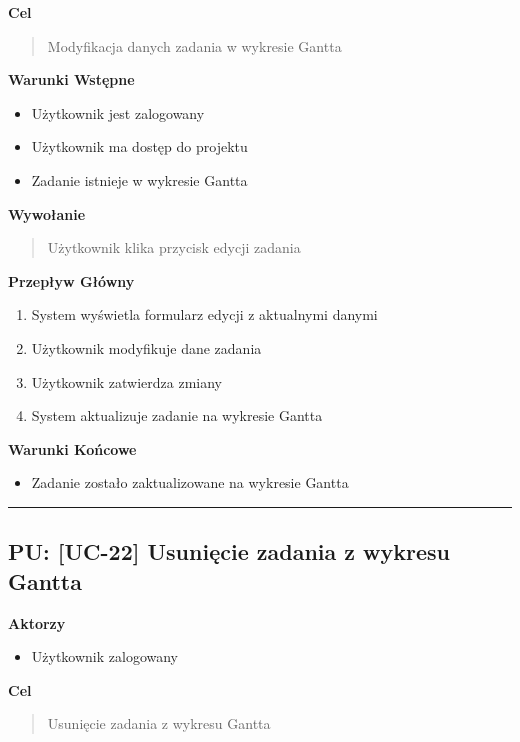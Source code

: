 \vspace{0.2cm}
\noindent\textbf{Cel}
\begin{quote}
    Modyfikacja danych zadania w wykresie Gantta
\end{quote}

\vspace{0.2cm}
\noindent\textbf{Warunki Wstępne}
\begin{itemize}
    \item Użytkownik jest zalogowany
    \item Użytkownik ma dostęp do projektu
    \item Zadanie istnieje w wykresie Gantta
\end{itemize}

\vspace{0.2cm}
\noindent\textbf{Wywołanie}
\begin{quote}
    Użytkownik klika przycisk edycji zadania
\end{quote}

\vspace{0.2cm}
\noindent\textbf{Przepływ Główny}
\begin{enumerate}
    \item System wyświetla formularz edycji z aktualnymi danymi
    \item Użytkownik modyfikuje dane zadania
    \item Użytkownik zatwierdza zmiany
    \item System aktualizuje zadanie na wykresie Gantta
\end{enumerate}

\vspace{0.2cm}
\noindent\textbf{Warunki Końcowe}
\begin{itemize}
    \item Zadanie zostało zaktualizowane na wykresie Gantta
\end{itemize}


\hrule
\vspace{1cm}

\subsection*{PU: [UC-22] Usunięcie zadania z wykresu Gantta}

\noindent\textbf{Aktorzy}
\begin{itemize}
    \item Użytkownik zalogowany
\end{itemize}

\vspace{0.2cm}
\noindent\textbf{Cel}
\begin{quote}
    Usunięcie zadania z wykresu Gantta
\end{quote}

